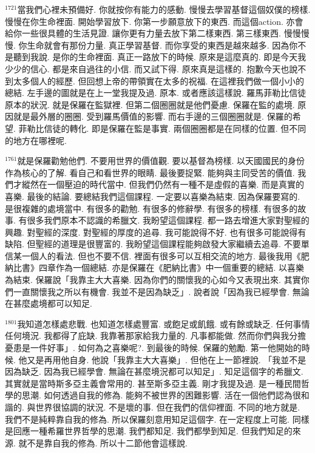 \documentclass{book}
\begin{document}
$^{1721}$當我們心裡未預備好.
你就按你有能力的感動.
慢慢去學習基督這個奴僕的榜樣.
慢慢在你生命裡面.
開始學習放下.
你第一步願意放下的東西.
而這個action.
亦會給你一些很具體的生活見證.
讓你更有力量去放下第二樣東西.
第三樣東西.
慢慢慢慢.
你生命就會有那份力量.
真正學習基督.
而你享受的東西是越來越多.
因為你不是聽到我說.
是你的生命裡面.
真正一路放下的時候.
原來是這麼真的.
即是今天我少少的信心.
都是來自過往的小信.
而又試下得.
原來真是這樣的.
抱歉今天也說不到太多個人的經歷.
但回想上帝的帶領實在太多的祝福.
在這裡我們做一個小小的總結.
左手邊的圖就是在上一堂我提及過.
原本.
或者應該這樣說.
羅馬菲勒比信徒原本的狀況.
就是保羅在監獄裡.
但第二個圈圈就是他們憂慮.
保羅在監的處境.
原因就是最外層的圈圈.
受到羅馬價值的影響.
而右手邊的三個圈圈就是.
保羅的希望.
菲勒比信徒的轉化.
即是保羅在監是事實.
兩個圈圈都是在同樣的位置.
但不同的地方在哪裡呢.

$^{1761}$就是保羅勸勉他們.
不要用世界的價值觀.
要以基督為榜樣.
以天國國民的身份作為核心的了解.
看自己和看世界的眼睛.
最後要捉緊.
能夠與主同受苦的價值.
我們才縱然在一個壓迫的時代當中.
但我們仍然有一種不是虛假的喜樂.
而是真實的喜樂.
最後的結論.
要總結我們這個課程.
一定要以喜樂為結束.
因為保羅要寫的.
是很複雜的處境當中.
有很多的勸勉.
有很多的修辭學.
有很多的榜樣.
有很多的故事.
有很多我們原本不認識的希臘文.
我盼望這個課程.
都一路去增進大家對聖經的興趣.
對聖經的深度.
對聖經的厚度的追尋.
我可能說得不好.
也有很多可能說得有缺陷.
但聖經的道理是很豐富的.
我盼望這個課程能夠啟發大家繼續去追尋.
不要單信某一個人的看法.
但也不要不信.
裡面有很多可以互相交流的地方.
最後我用《肥納比書》四章作為一個總結.
亦是保羅在《肥納比書》中一個重要的總結.
以喜樂為結束.
保羅說「我靠主大大喜樂.
因為你們的關懷我的心如今又表現出來.
其實你們一直關懷我之所以有機會.
我並不是因為缺乏」.
說者說「因為我已經學會.
無論在甚麼處境都可以知足.

$^{1801}$我知道怎樣處悲戰.
也知道怎樣處豐富.
或飽足或飢餓.
或有餘或缺乏.
任何事情 任何境況.
我都得了庇缺.
我靠著那家給我力量的.
凡事都能做.
然而你們與我分擔憂患是一件好事」.
如何為之喜樂呢?.
到最後的時候.
保羅的勉勵.
第一他開始的時候.
他又是再用他自身.
他說「我靠主大大喜樂」.
但他在上一節裡說.
「我並不是因為缺乏.
因為我已經學會.
無論在甚麼境況都可以知足」.
知足這個字的希臘文.
其實就是當時斯多亞主義會常用的.
甚至斯多亞主義.
剛才我提及過.
是一種民間哲學的思潮.
如何透過自我的修為.
能夠不被世界的困難影響.
活在一個他們認為很和諧的.
與世界很協調的狀況.
不是壞的事.
但在我們的信仰裡面.
不同的地方就是.
我們不是純粹靠自我的修為.
所以保羅刻意用知足這個字.
在一定程度上可能.
同樣是回應一種希羅世界哲學的思潮.
我們都知足.
我們都學到知足.
但我們知足的來源.
就不是靠自我的修為.
所以十二節他會這樣說.
\end{document}
